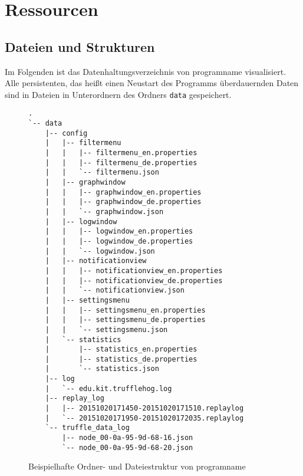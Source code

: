 \chapter{Ressourcen}
\section{Dateien und Strukturen}
Im Folgenden ist das Datenhaltungsverzeichnis von \gls{programname} visualisiert. Alle persistenten, das heißt einen Neustart des Programms überdauernden Daten sind in Dateien in Unterordnern des Ordners \texttt{data} gespeichert.
\clearpage
\begin{figure}[htb]
  \centering
\begin{verbatim}
.
`-- data
    |-- config
    |   |-- filtermenu
    |   |   |-- filtermenu_en.properties
    |   |   |-- filtermenu_de.properties
    |   |   `-- filtermenu.json
    |   |-- graphwindow
    |   |   |-- graphwindow_en.properties
    |   |   |-- graphwindow_de.properties
    |   |   `-- graphwindow.json
    |   |-- logwindow
    |   |   |-- logwindow_en.properties
    |   |   |-- logwindow_de.properties
    |   |   `-- logwindow.json
    |   |-- notificationview
    |   |   |-- notificationview_en.properties
    |   |   |-- notificationview_de.properties
    |   |   `-- notificationview.json
    |   |-- settingsmenu
    |   |   |-- settingsmenu_en.properties
    |   |   |-- settingsmenu_de.properties
    |   |   `-- settingsmenu.json
    |   `-- statistics
    |       |-- statistics_en.properties
    |       |-- statistics_de.properties
    |       `-- statistics.json
    |-- log
    |   `-- edu.kit.trufflehog.log
    |-- replay_log
    |   |-- 20151020171450-20151020171510.replaylog
    |   `-- 20151020171950-20151020172035.replaylog
    `-- truffle_data_log
        |-- node_00-0a-95-9d-68-16.json
        `-- node_00-0a-95-9d-68-20.json
\end{verbatim}
  \caption[Ordner- und Dateiestruktur von \gls{programname}]{Beispielhafte Ordner- und Dateiestruktur von \gls{programname}}
\end{figure}
\clearpage

